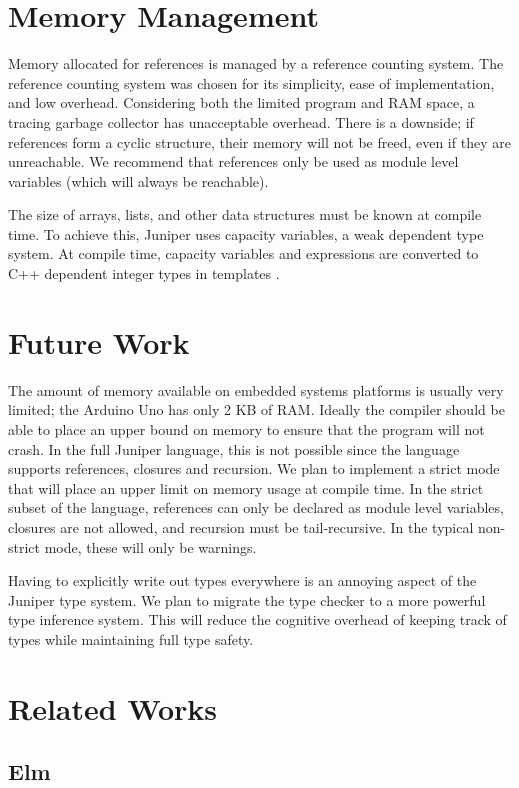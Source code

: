 \documentclass{sigplanconf}
\begin{document}
\section{Memory Management}

Memory allocated for references is managed by a reference counting system. The reference counting system was chosen for its simplicity, ease of implementation, and low overhead. Considering both the limited program and RAM space, a tracing garbage collector has unacceptable overhead. There is a downside; if references form a cyclic structure, their memory will not be freed, even if they are unreachable. We recommend that references only be used as module level variables (which will always be reachable).

The size of arrays, lists, and other data structures must be known at compile time. To achieve this, Juniper uses capacity variables, a weak dependent type system. At compile time, capacity variables and expressions are converted to C++ dependent integer types in templates \citep{stroustrup}.

\section{Future Work}

The amount of memory available on embedded systems platforms is usually very limited; the Arduino Uno has only 2 KB of RAM. Ideally the compiler should be able to place an upper bound on memory to ensure that the program will not crash. In the full Juniper language, this is not possible since the language supports references, closures and recursion. We plan to implement a strict mode that will place an upper limit on memory usage at compile time. In the strict subset of the language, references can only be declared as module level variables, closures are not allowed, and recursion must be tail-recursive. In the typical non-strict mode, these will only be warnings.

Having to explicitly write out types everywhere is an annoying aspect of the Juniper type system. We plan to migrate the type checker to a more powerful type inference system. This will reduce the cognitive overhead of keeping track of types while maintaining full type safety.

\section{Related Works}

\subsection{Elm}
\end{document}
